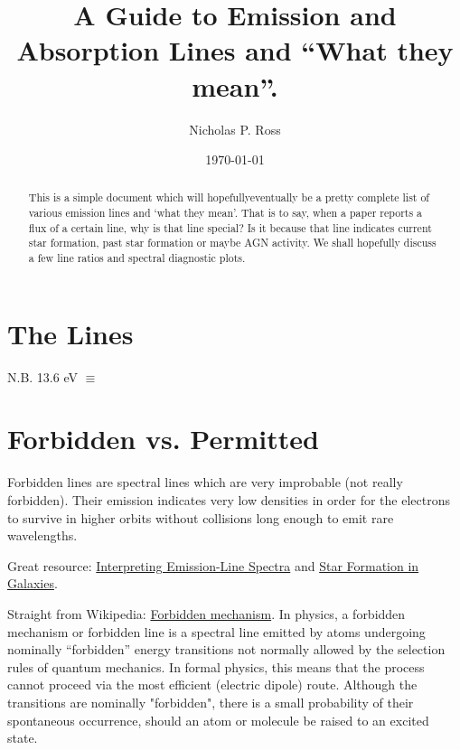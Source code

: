 \documentclass[11pt]{article}
\begin{document}
\title{A Guide to Emission and Absorption Lines and ``What they mean''.}
\author{Nicholas P. Ross}
\date{\today}
\maketitle


\begin{abstract}
This is a simple document which will hopefully\/eventually be a pretty complete
list of various emission lines and `what they mean'. That is to say, when a 
paper reports a flux of a certain line, why is that line special? Is it because
that line indicates current star formation, past star formation or maybe
AGN activity. We shall hopefully discuss a few line ratios and spectral
diagnostic plots. 
\end{abstract}


\section{The Lines}
\citet{Croom04}
\noindent
N.B. 13.6 eV $\equiv$


\section{Forbidden vs. Permitted}

Forbidden lines are spectral lines which are very improbable (not really forbidden). Their emission indicates very low densities in order for the electrons to survive in higher orbits without collisions long enough to emit rare wavelengths.

Great resource: \href{http://www.astr.ua.edu/keel/galaxies/emission.html}{Interpreting Emission-Line Spectra} and \href{http://www.astr.ua.edu/keel/galaxies/sfr.html}{Star Formation in Galaxies}. 

Straight from Wikipedia: \href{http://en.wikipedia.org/wiki/Forbidden_mechanism}{Forbidden mechanism}.
In physics, a forbidden mechanism or forbidden line is a spectral line
emitted by atoms undergoing nominally ``forbidden'' energy transitions
not normally allowed by the selection rules of quantum mechanics. In
formal physics, this means that the process cannot proceed via the
most efficient (electric dipole) route. Although the transitions are
nominally "forbidden", there is a small probability of their
spontaneous occurrence, should an atom or molecule be raised to an
excited state. %
\end{document}
